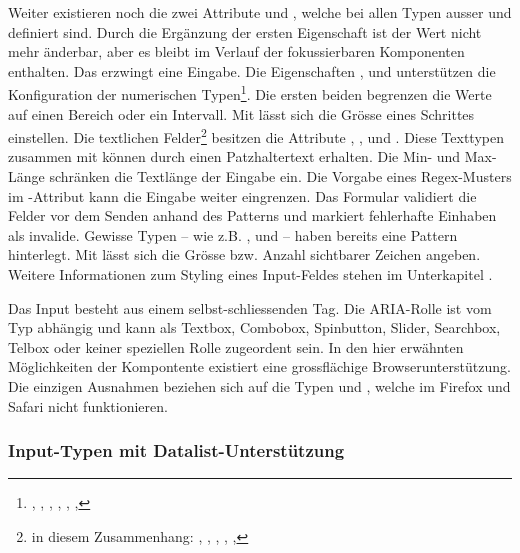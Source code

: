 Weiter existieren noch die zwei Attribute  und , welche bei allen Typen ausser  und  definiert sind.
Durch die Ergänzung der ersten Eigenschaft ist der Wert nicht mehr änderbar, aber es bleibt im Verlauf der fokussierbaren Komponenten enthalten.
Das  erzwingt eine Eingabe.
Die Eigenschaften ,  und  unterstützen die Konfiguration der numerischen Typen\footnote{
    , , , , , , 
}.
Die ersten beiden begrenzen die Werte auf einen Bereich oder ein Intervall.
Mit  lässt sich die Grösse eines Schrittes einstellen.
Die textlichen Felder\footnote{
    in diesem Zusammenhang: , , , , , 
} besitzen die Attribute , ,  und .
Diese Texttypen zusammen mit  können durch  einen Patzhaltertext erhalten.
Die Min- und Max-Länge schränken die Textlänge der Eingabe ein.
Die Vorgabe eines Regex-Musters im -Attribut kann die Eingabe weiter eingrenzen.
Das Formular validiert die Felder vor dem Senden anhand des Patterns und markiert fehlerhafte Einhaben als invalide.
Gewisse Typen – wie z.B. ,  und  – haben bereits eine Pattern hinterlegt.
Mit  lässt sich die Grösse bzw. Anzahl sichtbarer Zeichen angeben.
Weitere Informationen zum Styling eines Input-Feldes stehen im Unterkapitel \textbf{}.

Das Input besteht aus einem selbst-schliessenden Tag.
Die ARIA-Rolle ist vom Typ abhängig und kann als Textbox, Combobox, Spinbutton, Slider, Searchbox, Telbox oder keiner speziellen Rolle zugeordent sein.
In den hier erwähnten Möglichkeiten der Kompontente existiert eine grossflächige Browserunterstützung.
Die einzigen Ausnahmen beziehen sich auf die Typen  und , welche im Firefox und Safari nicht funktionieren.


\subsubsection{{\color{dgray} Input-Typen mit Datalist-Unterstützung}}
\label{sec:inputTypesDatalist}

